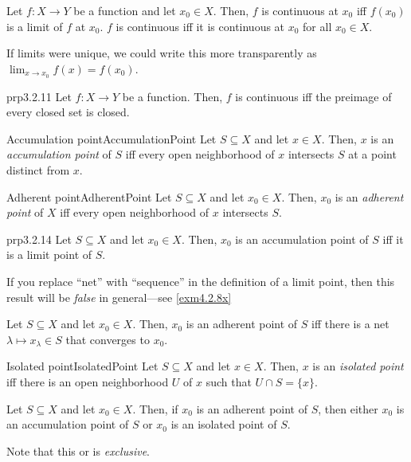 \begin{prp}{}{}
Let $f\colon X\rightarrow Y$ be a function and let $x_0\in X$.  Then, $f$ is continuous at $x_0$ iff $f(x_0)$ is a limit of $f$ at $x_0$.  $f$ is continuous iff it is continuous at $x_0$ for all $x_0\in X$.
\begin{rmk}
If limits were unique, we could write this more transparently as $\lim _{x\to x_0}f(x)=f(x_0)$.
\end{rmk}
\end{prp}
\begin{prp}{}{prp3.2.11}
Let $f\colon X\rightarrow Y$ be a function.  Then, $f$ is continuous iff the preimage of every closed set is closed.
\end{prp}
\begin{dfn}{Accumulation point}{AccumulationPoint}
Let $S\subseteq X$ and let $x\in X$.  Then, $x$ is an \emph{accumulation point} of $S$ iff every open neighborhood of $x$ intersects $S$ at a point distinct from $x$.
\end{dfn}
\begin{dfn}{Adherent point}{AdherentPoint}
Let $S\subseteq X$ and let $x_0\in X$.  Then, $x_0$ is an \emph{adherent point} of $X$ iff every open neighborhood of $x$ intersects $S$.
\end{dfn}
\begin{prp}{}{prp3.2.14}
Let $S\subseteq X$ and let $x_0\in X$.  Then, $x_0$ is an accumulation point of $S$ iff it is a limit point of $S$.
\begin{rmk}
If you replace ``net'' with ``sequence'' in the definition of a limit point, then this result will be \emph{false} in general---see \cref{exm4.2.8x}
\end{rmk}
\end{prp}
\begin{prp}{}{}
Let $S\subseteq X$ and let $x_0\in X$.  Then, $x_0$ is an adherent point of $S$ iff there is a net $\lambda \mapsto x_{\lambda} \in S$ that converges to $x_0$.
\end{prp}
\begin{dfn}{Isolated point}{IsolatedPoint}
Let $S\subseteq X$ and let $x\in X$.  Then, $x$ is an \emph{isolated point} iff there is an open neighborhood $U$ of $x$ such that $U\cap S=\{ x\}$.
\end{dfn}
\begin{prp}{}{}
Let $S\subseteq X$ and let $x_0\in X$.  Then, if $x_0$ is an adherent point of $S$, then either $x_0$ is an accumulation point of $S$ or $x_0$ is an isolated point of $S$.
\begin{rmk}
Note that this or is \emph{exclusive}.
\end{rmk}
\end{prp}
